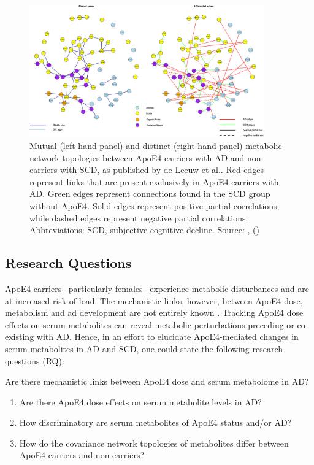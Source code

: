 \documentclass{amsart}
\begin{document}
\begin{figure}[htb]
\vspace*{-0.2cm}
  \includegraphics[width=0.9\textwidth]{figures/network.jpeg}
    \caption{Mutual (left-hand panel) and distinct (right-hand panel) metabolic network topologies between ApoE4 carriers with AD and non-carriers with SCD, as published by de Leeuw et al.. Red edges represent links that are present exclusively in ApoE4 carriers with AD. Green edges represent connections found in the SCD group without ApoE4. Solid edges represent positive partial correlations, while dashed edges represent negative partial correlations. Abbreviations: SCD, subjective cognitive decline. Source: ,  (\citeyear{deLeeuw2017Blood-basedDisease}) \cite{deLeeuw2017Blood-basedDisease}}
  \label{netan17}
\end{figure}

\newpage
\subsection{Research Questions}
ApoE4 carriers --particularly females-- experience metabolic disturbances and are at increased risk of \acrshort{load}. The mechanistic links, however, between ApoE4 dose, metabolism and \acrshort{ad} development are not entirely known \cite{Fernandez-Calle2022APOEDiseases}. Tracking ApoE4 dose effects on serum metabolites can reveal metabolic perturbations preceding or co-existing with AD. Hence, in an effort to elucidate ApoE4-mediated changes in serum metabolites in AD and SCD, one could state the following research questions (RQ):

Are there mechanistic links between ApoE4 dose and serum metabolome in AD?
\begin{enumerate}
    \item Are there ApoE4 dose effects on serum metabolite levels in AD?
    \item How discriminatory are serum metabolites of ApoE4 status and/or AD?
    \item How do the covariance network topologies of metabolites differ between ApoE4 carriers and non-carriers?
\end{enumerate}
\end{document}
